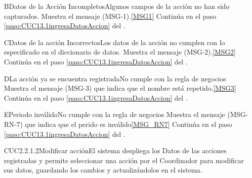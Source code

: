 	\begin{UCtrayectoriaA}{B}{Datos de la Acción Incompletos}{Algunos campos de la acción no han sido capturados.}
			\UCpaso Muestra el mensaje (MSG-1).\ref{MSG1}
			\UCpaso Continúa en el paso \ref{paso:CUC13.1ingresaDatosAccion} del .
	\end{UCtrayectoriaA}

	\begin{UCtrayectoriaA}{C}{Datos de la acción Incorrectos}{Los datos de la acción no cumplen con lo especificado en el diccionario de datos.}
			\UCpaso Muestra el mensaje (MSG-2).\ref{MSG2}
			\UCpaso Continúa en el paso \ref{paso:CUC13.1ingresaDatosAccion} del .
	\end{UCtrayectoriaA}

		\begin{UCtrayectoriaA}{D}{La acción ya se encuentra registrada}{No cumple con la regla de negocios }
			\UCpaso Muestra el mensaje (MSG-3) que indica que el nombre está repetido.\ref{MSG3}
			\UCpaso Continúa en el paso \ref{paso:CUC13.1ingresaDatosAccion} del .
		\end{UCtrayectoriaA}
		\begin{UCtrayectoriaA}{E}{Periodo inválido}{No cumple con la regla de negocios }
			\UCpaso Muestra el mensaje (MSG-RN-7) que indica que el perido es inválido\ref{MSG_RN7}
			\UCpaso Continúa en el paso \ref{paso:CUC13.1ingresaDatosAccion} del .
		\end{UCtrayectoriaA}

	\begin{UseCase}{CUC2.2.1.2}{Modificar acción}{El sistema despliega los Datos de las acciones registradas y permite seleccionar una acción por el Coordinador para modificar sus datos, guardando los cambios y actualizándolos en el sistema.}
	\end{UseCase}

